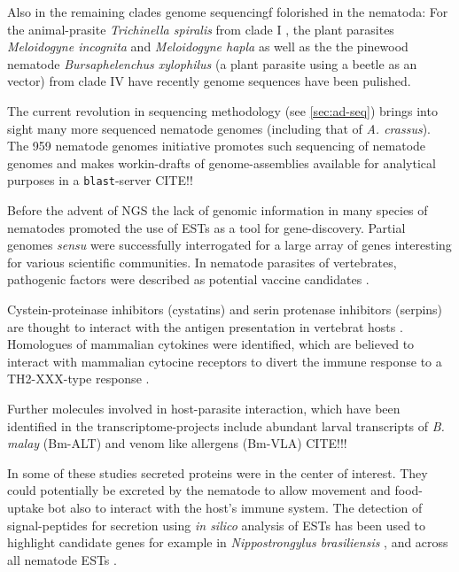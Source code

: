 Also in the remaining clades genome sequencingf folorished in the
nematoda: For the animal-prasite \textit{Trichinella spiralis} from
clade I \cite{pmid21336279}, the plant parasites \textit{Meloidogyne
  incognita} \cite{pmid18660804} and \textit{Meloidogyne hapla}
\cite{pmid18809916} as well as the the pinewood nematode
\textit{Bursaphelenchus xylophilus} \cite{pmid21909270} (a plant
parasite using a beetle as an vector) from clade IV have recently
genome sequences have been pulished.

The current revolution in sequencing methodology (see
\ref{sec:ad-seq}) brings into sight many more sequenced nematode
genomes (including that of \textit{A. crassus}). The 959 nematode
genomes initiative promotes such sequencing of nematode genomes and
makes workin-drafts of genome-assemblies available for analytical
purposes in a \texttt{blast}-server CITE!!

Before the advent of NGS the lack of genomic information in many
species of nematodes promoted the use of ESTs as a tool for
gene-discovery. Partial genomes \textit{sensu}
\cite{parkinson_partigene--constructing_2004} were successfully
interrogated for a large array of genes interesting for various
scientific communities. In nematode parasites of vertebrates,
pathogenic factors were described as potential vaccine candidates
\cite{pmid11406138}.

Cystein-proteinase inhibitors (cystatins) and serin protenase
inhibitors (serpins) are thought to interact with the antigen
presentation in vertebrat hosts \cite{pmid11406138}. Homologues of
mammalian cytokines were identified, which are believed to interact
with mammalian cytocine receptors to divert the immune response to a
TH2-XXX-type response \cite{maizels_helminth_2004}.

Further molecules involved in host-parasite interaction, which have
been identified in the transcriptome-projects include abundant larval
transcripts of \textit{B. malay} (Bm-ALT)
\cite{gomez-escobar_abundant_2002} and venom like allergens (Bm-VLA)
CITE!!!

In some of these studies secreted proteins were in the center of
interest. They could potentially be excreted by the nematode to allow
movement and food-uptake bot also to interact with the host's immune
system. The detection of signal-peptides for secretion using
\textit{in silico} analysis of ESTs has been used to highlight
candidate genes for example in \textit{Nippostrongylus brasiliensis}
\cite{harcus_signal_2004}, and across all nematode ESTs
\cite{nagaraj_needles_2008}.

